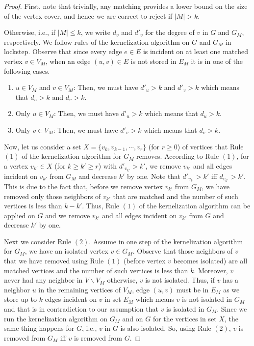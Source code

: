 \documentclass[11pt,letter]{article}
\begin{document}
\begin{proof}
First, note that trivially, any matching provides a lower bound on the
size of the vertex cover, and hence we are correct to reject if
$|M|>k$.


Otherwise, i.e., if $|M|\le k$, we write $d_v$ and $d'_v$ for the degree of $v$
in $G$ and $G_M$, respectively. We follow rules of the kernelization algorithm
on $G$ and $G_M$ in lockstep. Observe that since every edge $e\in E$ is incident
on at least one matched vertex $v\in V_M$, when an edge
$(u,v)\in E$ is not stored in $E_M$ it is in one of the following
cases.
\begin{enumerate}
\item $u\in V_M$ and $v\in V_M$:
Then, we must have $d'_u>k$ and $d'_v>k$ which means that $d_u>k$ and $d_v>k$.
\item Only $u\in V_M$:
Then, we must have $d'_u>k$ which means that $d_u>k$.
\item Only $v\in V_M$:
Then, we must have $d'_v>k$ which means that $d_v>k$.
\end{enumerate}



Now, let us consider a set $X=\{v_{k},v_{k-1},\cdots,v_r\}$ (for $r\ge 0$) of vertices
that Rule $(1)$ of the kernelization algorithm for $G_M$ removes. According to Rule
$(1)$, for a vertex $v_{k'}\in X$ (for $k\ge k'\ge r$) with $d'_{v_{k'}} > k'$, we
remove $v_{k'}$ and all edges incident on $v_{k'}$ from $G_M$ and decrease $k'$ by one.
Note that $d'_{v_{k'}} > k'$ iff $d_{v_{k'}} > k'$. This is due to the fact that,
before we remove vertex $v_{k'}$ from $G_M$,
we have removed only  those neighbors of $v_{k'}$ that are matched and the number of
such vertices is less than $k-k'$. Thus, Rule $(1)$ of the kernelization algorithm can be applied
on $G$ and we remove $v_{k'}$ and all edges
incident on $v_{k'}$ from $G$ and decrease $k'$ by one.




Next we consider Rule $(2)$. Assume in one step of the kernelization algorithm for $G_M$,
we have an isolated vertex $v\in G_M$. Observe that those neighbors of $v$ that we
have removed using Rule $(1)$ (before vertex $v$ becomes isolated) are all matched vertices
and the number of such vertices is less than $k$.
Moreover, $v$ never had any neighbor in $V\backslash V_M$ otherwise, $v$ is not isolated.
Thus, if $v$ has a neighbor $u$ in the remaining vertices of $V_M$,
edge $(u,v)$ must be in $E_M$ as we store up to $k$ edges incident on $v$ in
set $E_M$ which means $v$ is not isolated in $G_M$ and that is in contradiction
to our assumption that $v$ is isolated in $G_M$.
Since we run the kernelization algorithm on $G_M$ and
on $G$ for the vertices in set $X$, the same thing happens for $G$, i.e.,
$v$ in $G$ is also isolated. So, using Rule $(2)$, $v$ is removed from
$G_M$ iff $v$ is removed from $G$.





\end{proof}
\end{document}
